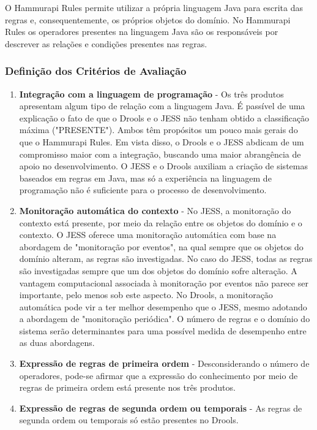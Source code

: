 O Hammurapi Rules permite utilizar a própria linguagem Java para escrita das regras e, consequentemente, os próprios objetos do domínio. No Hammurapi Rules os operadores presentes na
linguagem Java são os responsáveis por descrever as relações e condições presentes nas
regras.

\subsubsection{Defini\c{c}\~ao dos Crit\'erios de Avalia\c{c}\~ao}

\begin{enumerate}
\item \textbf{Integra\c{c}\~ao com a linguagem de programa\c{c}\~ao} - Os tr\^es produtos apresentam algum tipo de rela\c{c}\~ao com a linguagem Java. \'E pass\'ivel de uma explica\c{c}\~ao o fato de que o Drools e o JESS n\~ao tenham obtido a classifica\c{c}\~ao m\'axima ("PRESENTE"). Ambos t\^em prop\'ositos um pouco mais gerais do que o
Hammurapi Rules. Em vista disso, o Drools e o JESS abdicam de um compromisso maior com a integra\c{c}\~ao, buscando uma maior abrang\^encia de apoio no desenvolvimento. O JESS e o Drools auxiliam a cria\c{c}\~ao de sistemas baseados em regras em Java, mas s\'o a experi\^encia na linguagem de programa\c{c}\~ao n\~ao \'e suficiente para o
processo de desenvolvimento.

\item \textbf{Monitora\c{c}\~ao autom\'atica do contexto} - No JESS, a monitora\c{c}\~ao do contexto est\'a presente, por meio da rela\c{c}\~ao entre os objetos do dom\'inio e o contexto. O JESS oferece uma monitora\c{c}\~ao autom\'atica com base na abordagem de "monitora\c{c}\~ao por eventos", na qual sempre que os objetos do dom\'inio alteram, as regras s\~ao investigadas. No caso do JESS, todas as regras s\~ao investigadas sempre que um dos objetos do dom\'inio sofre altera\c{c}\~ao. A vantagem computacional associada \`a monitora\c{c}\~ao por eventos n\~ao parece ser importante, pelo menos sob este aspecto. No Drools, a monitora\c{c}\~ao autom\'atica pode vir a ter melhor desempenho que o JESS, mesmo adotando a abordagem de "monitora\c{c}\~ao peri\'odica". O n\'umero de regras e o dom\'inio do sistema ser\~ao determinantes para uma poss\'ivel medida de desempenho entre as duas abordagens.

\item \textbf{Express\~ao de regras de primeira ordem} - Desconsiderando o n\'umero de operadores, pode-se afirmar que a express\~ao do conhecimento por meio de regras de primeira ordem est\'a presente nos tr\^es produtos.

\item \textbf{Express\~ao de regras de segunda ordem ou temporais} - As regras de segunda ordem ou temporais s\'o est\~ao presentes no Drools. 
\end{enumerate}


